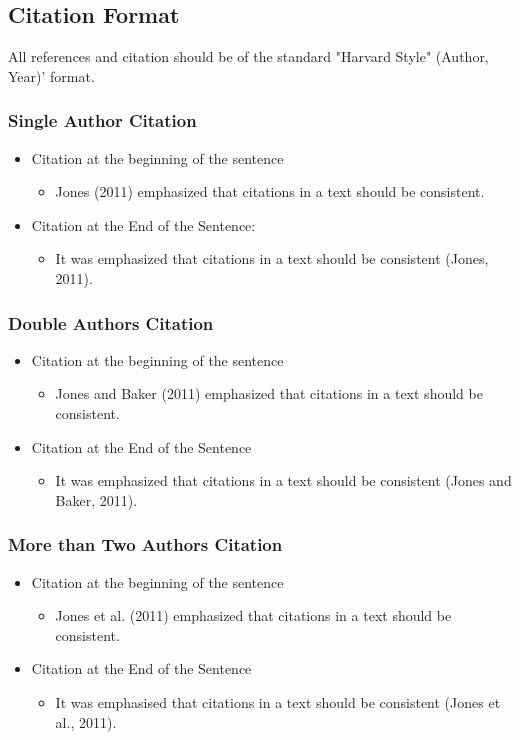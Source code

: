\subsection{Citation Format}
All references and citation should be of the standard "Harvard Style" (Author, Year)’ format.
\subsubsection{Single Author Citation}
\begin{itemize}
	\item Citation at the beginning of the sentence
	\begin{itemize}
		\item Jones (2011) emphasized that citations in a text should be consistent.
	\end{itemize}
	\item Citation at the End of the Sentence:
	\begin{itemize}
		\item It was emphasized that citations in a text should be consistent (Jones, 2011).
	\end{itemize}	
\end{itemize}

\subsubsection{Double Authors Citation}
\begin{itemize}
	\item Citation at the beginning of the sentence
	\begin{itemize}
		\item Jones and Baker (2011) emphasized that citations in a text should be consistent.
	\end{itemize}
	\item Citation at the End of the Sentence
	\begin{itemize}
		\item It was emphasized that citations in a text should be consistent (Jones and Baker, 2011).
	\end{itemize}	
\end{itemize}

\subsubsection{More than Two Authors Citation}
\begin{itemize}
	\item Citation at the beginning of the sentence
	\begin{itemize}
		\item Jones et al. (2011) emphasized that citations in a text should be consistent.
	\end{itemize}
	\item Citation at the End of the Sentence
	\begin{itemize}
		\item It was emphasised that citations in a text should be consistent (Jones et al., 2011).
	\end{itemize}	
\end{itemize}

